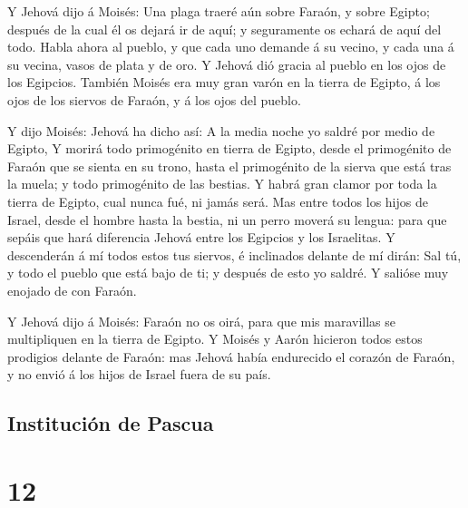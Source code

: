  Y Jehová dijo á Moisés: Una plaga traeré aún sobre
Faraón, y sobre Egipto; después de la cual él os dejará ir de aquí; y
seguramente os echará de aquí del todo.  Habla ahora al
pueblo, y que cada uno demande á su vecino, y cada una á su vecina,
vasos de plata y de oro.  Y Jehová dió gracia al pueblo en
los ojos de los Egipcios. También Moisés era muy gran varón en la tierra
de Egipto, á los ojos de los siervos de Faraón, y á los ojos del pueblo.

 Y dijo Moisés: Jehová ha dicho así: A la media noche yo
saldré por medio de Egipto,  Y morirá todo primogénito en
tierra de Egipto, desde el primogénito de Faraón que se sienta en su
trono, hasta el primogénito de la sierva que está tras la muela; y todo
primogénito de las bestias.  Y habrá gran clamor por toda
la tierra de Egipto, cual nunca fué, ni jamás será.  Mas
entre todos los hijos de Israel, desde el hombre hasta la bestia, ni un
perro moverá su lengua: para que sepáis que hará diferencia Jehová entre
los Egipcios y los Israelitas.  Y descenderán á mí todos
estos tus siervos, é inclinados delante de mí dirán: Sal tú, y todo el
pueblo que está bajo de ti; y después de esto yo saldré. Y salióse muy
enojado de con Faraón.

 Y Jehová dijo á Moisés: Faraón no os oirá, para que mis
maravillas se multipliquen en la tierra de Egipto.  Y
Moisés y Aarón hicieron todos estos prodigios delante de Faraón: mas
Jehová había endurecido el corazón de Faraón, y no envió á los hijos de
Israel fuera de su país.

\hypertarget{instituciuxf3n-de-pascua}{%
\subsection{Institución de Pascua}\label{instituciuxf3n-de-pascua}}

\hypertarget{section-02-12}{%
\section{12}\label{section-02-12}}


